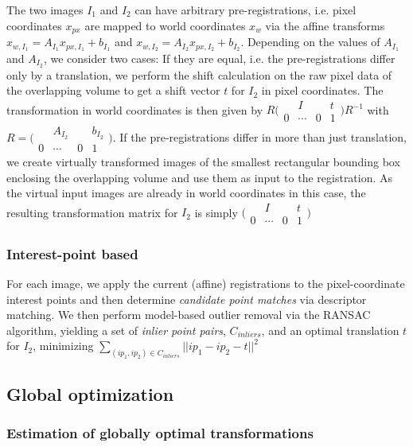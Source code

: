 The two images $I_1$ and $I_2$ can have arbitrary pre-registrations, i.e. pixel coordinates $x_{px}$ are mapped to world coordinates $x_w$ via the affine transforms $x_{w,I_1} = A _{I_1}x_{px,I_1} + b_{I_1}$ and $x_{w,I_2} = A _{I_2}x_{px,I_2} + b_{I_2}$. Depending on the values of $ A _{I_1}$ and $ A _{I_2}$, we consider two cases: If they are equal, i.e. the pre-registrations differ only by a translation, we perform the shift calculation on the raw pixel data of the overlapping volume to get a shift vector $t$ for $I_2$ in pixel coordinates. The transformation in world coordinates is then given by $R \bigl(\begin{smallmatrix}  & I & & t \\  0 & \cdots & 0 & 1 \end{smallmatrix}\bigr) R^{-1} $ with $R = \bigl(\begin{smallmatrix}  & A_{I_2} & & b_{I_2} \\  0 & \cdots & 0 & 1 \end{smallmatrix}\bigr)$. If the pre-registrations differ in more than just translation, we create virtually transformed images of the smallest rectangular bounding box enclosing the overlapping volume and use them as input to the registration. As the virtual input images are already in world coordinates in this case, the resulting transformation matrix for $I_2$ is simply $\bigl(\begin{smallmatrix}  & I & & t \\  0 & \cdots & 0 & 1 \end{smallmatrix}\bigr)$

\subsubsection{Interest-point based}

For each image, we apply the current (affine) registrations to the pixel-coordinate interest points and then determine \emph{candidate point matches} via descriptor matching. We then perform model-based outlier removal via the RANSAC algorithm, yielding a set of \emph{inlier point pairs}, $C_{inliers}$, and an optimal translation $t$ for $I_2$, minimizing $\sum_{(ip_1, ip_2) \in C_{inliers} }{|| ip_1 - ip_2 - t||^2}$

\subsection{Global optimization}

\subsubsection{Estimation of globally optimal transformations}

